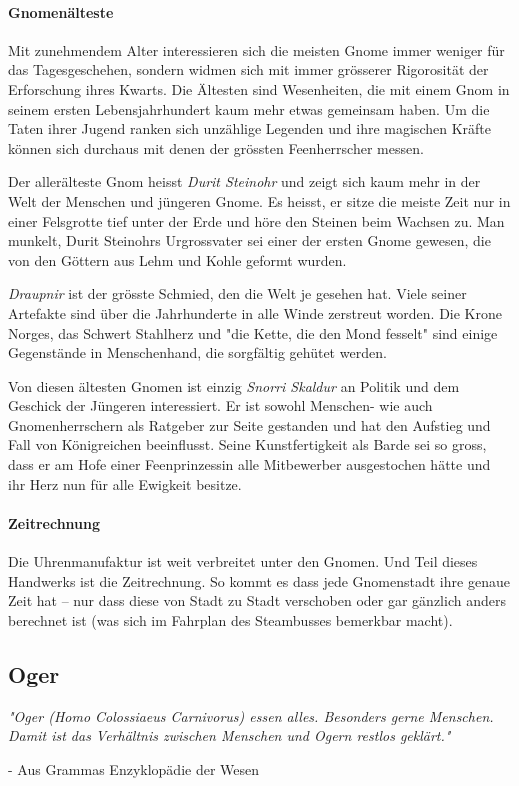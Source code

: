 \documentclass[10pt,twoside,twocolumn,openany]{book}
\begin{document}
\paragraph{Gnomenälteste}
Mit zunehmendem Alter interessieren sich die meisten Gnome immer weniger für das Tagesgeschehen, sondern widmen sich mit immer grösserer Rigorosität der Erforschung ihres Kwarts. Die Ältesten sind Wesenheiten, die mit einem Gnom in seinem ersten Lebensjahrhundert kaum mehr etwas gemeinsam haben. Um die Taten ihrer Jugend ranken sich unzählige Legenden und ihre magischen Kräfte können sich durchaus mit denen der grössten Feenherrscher messen.

Der allerälteste Gnom heisst \emph{Durit Steinohr} und zeigt sich kaum mehr in der Welt der Menschen und jüngeren Gnome. Es heisst, er sitze die meiste Zeit nur in einer Felsgrotte tief unter der Erde und höre den Steinen beim Wachsen zu. Man munkelt, Durit Steinohrs Urgrossvater sei einer der ersten Gnome gewesen, die von den Göttern aus Lehm und Kohle geformt wurden.

\emph{Draupnir} ist der grösste Schmied, den die Welt je gesehen hat. Viele seiner Artefakte sind über die Jahrhunderte in alle Winde zerstreut worden. Die Krone Norges, das Schwert Stahlherz und "die Kette, die den Mond fesselt" sind einige Gegenstände in Menschenhand, die sorgfältig gehütet werden.

Von diesen ältesten Gnomen ist einzig \emph{Snorri Skaldur} an Politik und dem Geschick der Jüngeren interessiert. Er ist sowohl Menschen- wie auch Gnomenherrschern als Ratgeber zur Seite gestanden und hat den Aufstieg und Fall von Königreichen beeinflusst. Seine Kunstfertigkeit als Barde sei so gross, dass er am Hofe einer Feenprinzessin alle Mitbewerber ausgestochen hätte und ihr Herz nun für alle Ewigkeit besitze. 

\paragraph{Zeitrechnung}
Die Uhrenmanufaktur ist weit verbreitet unter den Gnomen. Und Teil dieses Handwerks ist die Zeitrechnung. So kommt es dass jede Gnomenstadt ihre genaue Zeit hat – nur dass diese von Stadt zu Stadt verschoben oder gar gänzlich anders berechnet ist (was sich im Fahrplan des Steambusses bemerkbar macht).


\subsection{Oger}
\begin{quotebox}
	\textit{"Oger (Homo Colossiaeus Carnivorus) essen alles. Besonders gerne Menschen. Damit ist das Verhältnis zwischen Menschen und Ogern restlos geklärt."}
	\begin{flushright}
		- Aus Grammas Enzyklopädie der Wesen
	\end{flushright}
\end{quotebox}
\end{document}
